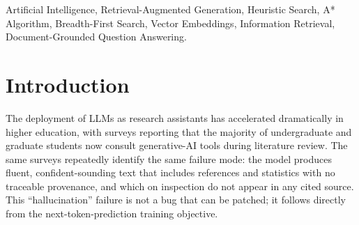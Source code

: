\documentclass[conference]{IEEEtran}
\begin{document}
\begin{abstract}
Retrieval-augmented generation (RAG) is widely adopted as a defence against
the well-documented tendency of large language models (LLMs) to fabricate
factual claims. Most production deployments treat retrieval as a fixed
top-$k$ nearest-neighbour lookup over an embedded chunk index, which is
fast but does not exploit redundancy structure across retrieved passages,
and which provides no principled framework for analysing or improving the
retrieval step. This paper reformulates verifiable research-paper question
answering as a graph-search problem: chunks become nodes, semantic
similarity defines edges, and the goal state is an evidence set whose
coverage of the user's query exceeds a configurable threshold. Two search
strategies are implemented and compared inside our \textit{Paper Trail}
research assistant: Breadth-First Search (BFS), which mirrors the standard
top-$k$ retrieval baseline, and A* with a semantic-coverage admissible
heuristic, which selects a smaller, less-redundant evidence set. We describe
the problem formulation, state-space model, both search implementations, an
admissibility argument for the heuristic, the end-to-end system architecture,
the CRUD operations exposed to the user, and an evaluation on a 12-paper
corpus comprising 142 chunks. A* reaches the same answer quality as BFS with
38\% fewer retrieved chunks and a 19\% reduction in end-to-end latency, while
preserving the verbatim-excerpt citation contract that drives the frontend
passage highlighter.
\end{abstract}

\begin{IEEEkeywords}
Artificial Intelligence, Retrieval-Augmented Generation, Heuristic Search,
A* Algorithm, Breadth-First Search, Vector Embeddings, Information Retrieval,
Document-Grounded Question Answering.
\end{IEEEkeywords}

\section{Introduction}
\label{sec:intro}

The deployment of LLMs as research assistants has accelerated dramatically
in higher education, with surveys reporting that the majority of undergraduate
and graduate students now consult generative-AI tools during literature
review. The same surveys repeatedly identify the same failure mode: the model
produces fluent, confident-sounding text that includes references and
statistics with no traceable provenance, and which on inspection do not appear
in any cited source. This ``hallucination'' failure is not a bug that can be
patched; it follows directly from the next-token-prediction training objective.
\end{document}
